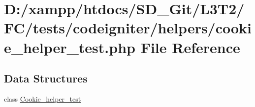 \hypertarget{tests_2codeigniter_2helpers_2cookie__helper__test_8php}{}\section{D\+:/xampp/htdocs/\+S\+D\+\_\+\+Git/\+L3\+T2/\+F\+C/tests/codeigniter/helpers/cookie\+\_\+helper\+\_\+test.php File Reference}
\label{tests_2codeigniter_2helpers_2cookie__helper__test_8php}
\subsection*{Data Structures}
\begin{DoxyCompactItemize}
\item 
class \hyperlink{class_cookie__helper__test}{Cookie\+\_\+helper\+\_\+test}
\end{DoxyCompactItemize}

